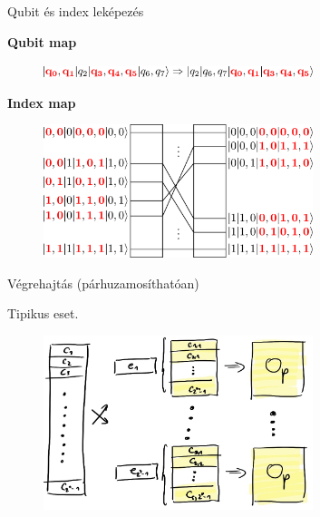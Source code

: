 \documentclass[aspectratio=169]{beamer}
\begin{document}
\begin{frame}{Qubit és index leképezés}

\vspace{0.25cm}
\textbf{Qubit map}
\vspace{-0.4cm}
\begin{figure}[H]
    \centering
    \includegraphics[width=0.7\textwidth]{figures/qubit_mapping.png}
\end{figure}
\vspace{-0.4cm}
\textbf{Index map}
\vspace{-0.4cm}
\begin{figure}[H]
  \centering
  \includegraphics[width=0.7\textwidth]{figures/index_mapping.png}
\end{figure}

\end{frame}


\begin{frame}{Végrehajtás (párhuzamosíthatóan)}

Tipikus eset.

\begin{figure}[H]
    \centering
    \includegraphics[width=0.7\textwidth]{figures/vegrehajtas.jpg}
\end{figure}

\end{frame}
\end{document}
